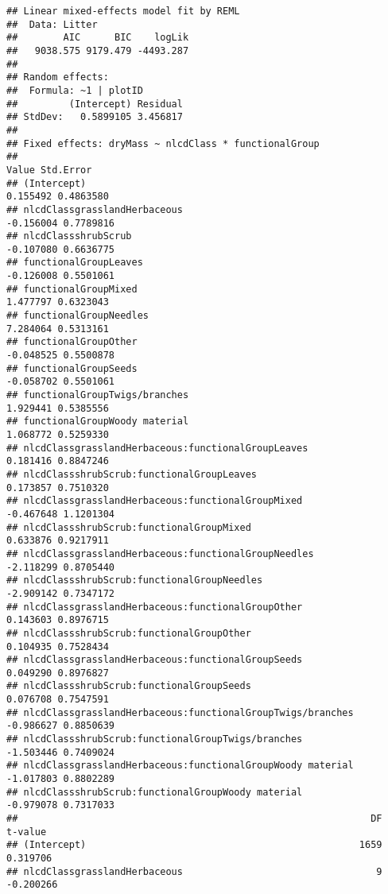 \documentclass[]{article}
\begin{document}
\begin{verbatim}
## Linear mixed-effects model fit by REML
##  Data: Litter 
##        AIC      BIC    logLik
##   9038.575 9179.479 -4493.287
## 
## Random effects:
##  Formula: ~1 | plotID
##         (Intercept) Residual
## StdDev:   0.5899105 3.456817
## 
## Fixed effects: dryMass ~ nlcdClass * functionalGroup 
##                                                                Value Std.Error
## (Intercept)                                                 0.155492 0.4863580
## nlcdClassgrasslandHerbaceous                               -0.156004 0.7789816
## nlcdClassshrubScrub                                        -0.107080 0.6636775
## functionalGroupLeaves                                      -0.126008 0.5501061
## functionalGroupMixed                                        1.477797 0.6323043
## functionalGroupNeedles                                      7.284064 0.5313161
## functionalGroupOther                                       -0.048525 0.5500878
## functionalGroupSeeds                                       -0.058702 0.5501061
## functionalGroupTwigs/branches                               1.929441 0.5385556
## functionalGroupWoody material                               1.068772 0.5259330
## nlcdClassgrasslandHerbaceous:functionalGroupLeaves          0.181416 0.8847246
## nlcdClassshrubScrub:functionalGroupLeaves                   0.173857 0.7510320
## nlcdClassgrasslandHerbaceous:functionalGroupMixed          -0.467648 1.1201304
## nlcdClassshrubScrub:functionalGroupMixed                    0.633876 0.9217911
## nlcdClassgrasslandHerbaceous:functionalGroupNeedles        -2.118299 0.8705440
## nlcdClassshrubScrub:functionalGroupNeedles                 -2.909142 0.7347172
## nlcdClassgrasslandHerbaceous:functionalGroupOther           0.143603 0.8976715
## nlcdClassshrubScrub:functionalGroupOther                    0.104935 0.7528434
## nlcdClassgrasslandHerbaceous:functionalGroupSeeds           0.049290 0.8976827
## nlcdClassshrubScrub:functionalGroupSeeds                    0.076708 0.7547591
## nlcdClassgrasslandHerbaceous:functionalGroupTwigs/branches -0.986627 0.8850639
## nlcdClassshrubScrub:functionalGroupTwigs/branches          -1.503446 0.7409024
## nlcdClassgrasslandHerbaceous:functionalGroupWoody material -1.017803 0.8802289
## nlcdClassshrubScrub:functionalGroupWoody material          -0.979078 0.7317033
##                                                              DF   t-value
## (Intercept)                                                1659  0.319706
## nlcdClassgrasslandHerbaceous                                  9 -0.200266

\end{verbatim}
\end{document}
